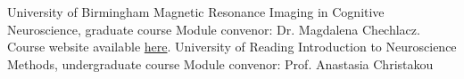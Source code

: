 {University of Birmingham}
{Magnetic Resonance Imaging in Cognitive Neuroscience, \footnotesize graduate course}
{\footnotesize Module convenor: Dr. Magdalena Chechlacz. Course website available \href{https://chbh-opensource.github.io/mri-on-bear-edu/}{here}.}
\vspace{0.7em}
{University of Reading}
{Introduction to Neuroscience Methods, \footnotesize undergraduate course}
{\footnotesize Module convenor: Prof. Anastasia Christakou}
